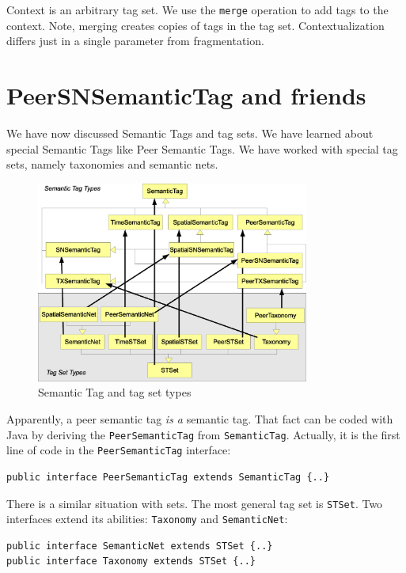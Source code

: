 Context is an arbitrary tag set. We use the {\tt merge} operation to add tags to the context. Note, merging creates copies of tags in the tag  set. Contextualization differs just in a single parameter from fragmentation.

\section{PeerSNSemanticTag and friends}
We have now discussed Semantic Tags and tag sets. We have learned about special Semantic Tags like Peer Semantic Tags. We have worked with special tag sets, namely taxonomies and semantic nets. 

\begin{figure}[t]
\centering
\includegraphics[width=0.80\textwidth]{tagsSetTypes.eps}
\caption{Semantic Tag and tag set types}
\label{fig:tagsSetTypes}
\end{figure}

Apparently, a peer semantic tag {\it is a} semantic tag. That fact can be coded with Java by deriving the {\tt PeerSemanticTag} from {\tt SemanticTag}.  Actually, it is the first line of code in the {\tt PeerSemanticTag} interface:

\begin{verbatim}
public interface PeerSemanticTag extends SemanticTag {..}
\end{verbatim}

There is a similar situation with sets. The most general tag set is {\tt STSet}. Two interfaces extend its abilities: {\tt Taxonomy} and {\tt SemanticNet}:

\begin{verbatim}
public interface SemanticNet extends STSet {..}
public interface Taxonomy extends STSet {..}
\end{verbatim}

